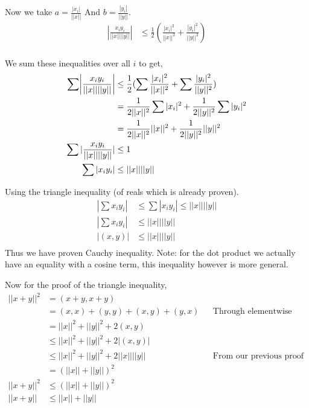 \documentclass{article}
\DeclarePairedDelimiter{\abs}{\lvert}{\rvert}
\begin{document}
Now we take $a = \frac{|x_i|}{||x||}$ And $b = \frac{|y_i|}{||y||}$.
\begin{align*}
    |\frac{x_i y_i}{||x|| ||y||}| &\leq \frac{1}{2} (\frac{|x_i|^2}{||x||^2} + \frac{|y_i|^2}{||y||^2}) \\
\end{align*}

We sum these inequalities over all $i$ to get,
\begin{align*}
    \sum \abs*{\frac{x_i y_i}{||x|| ||y||}} &\leq \frac{1}{2} (\sum \frac{|x_i|^2}{||x||^2} + \sum \frac{|y_i|^2}{||y||^2}) \\
    &= \frac{1}{2||x||^2} \sum |x_i|^2 + \frac{1}{2||y||^2} \sum |y_i|^2 \\
    &= \frac{1}{2||x||^2} ||x||^2 + \frac{1}{2||y||^2} ||y||^2 \\
    \sum |\frac{x_i y_i}{||x|| ||y||}| &\leq 1 \\
    \sum |x_i y_i| &\leq ||x|| ||y|| \\
\end{align*}

Using the triangle inequality (of reals which is already proven).
\begin{align*}
    |\sum x_i y_i| &\leq \sum |x_i y_i| \leq ||x|| ||y|| \\
    |\sum x_i y_i| &\leq ||x|| ||y|| \\
    |(x,y)| &\leq ||x|| ||y|| \\
\end{align*}
Thus we have proven Cauchy inequality. Note: for the dot product we actually
have an equality with a cosine term, this inequality however is more general.

Now for the proof of the triangle inequality,
\begin{align*}
    ||x + y||^2 &= (x+y, x+y) \\
    &= (x,x) + (y,y) + (x,y) + (y,x) && \text{Through elementwise expansion} \\
    &= ||x||^2 + ||y||^2 + 2(x,y) \\
    &\leq ||x||^2 + ||y||^2 + 2|(x,y)| \\
    &\leq ||x||^2 + ||y||^2 + 2||x|| ||y|| && \text{From our previous proof} \\
    &= {(||x|| + ||y||)}^2 \\
    ||x + y||^2 &\leq {(||x|| + ||y||)}^2 \\
    ||x + y|| &\leq ||x|| + ||y|| \\
\end{align*}
\end{document}
